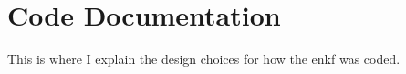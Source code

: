\appendix
\chapter{Code Documentation}\label{app:code_docs}

This is where I explain the design choices for how the enkf was coded.

